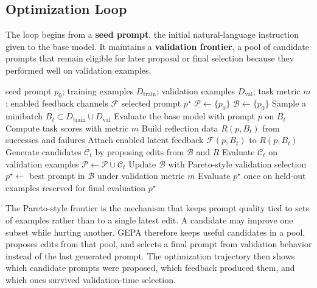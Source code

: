\documentclass[12pt,a4paper,twoside,openright]{book}
\begin{document}
\subsection{Optimization Loop}

The loop begins from a \textbf{seed prompt}, the initial natural-language
instruction given to the base model. It maintains a \textbf{validation frontier},
a pool of candidate prompts that remain eligible for later proposal or final
selection because they performed well on validation examples.

\begin{algorithm}[!htb]
    \caption{Latent-GEPA prompt optimization loop.}
    \label{alg:latent-gepa-loop}
    \begin{algorithmic}[1]
        \Require seed prompt $p_0$; training examples $D_{\mathrm{train}}$;
        validation examples $D_{\mathrm{val}}$; task metric $m$; enabled feedback
        channels $\mathcal{F}$
        \Ensure selected prompt $p^\star$
        \State $\mathcal{P} \gets \{p_0\}$ 
        \State $\mathcal{B} \gets \{p_0\}$ 
            \State Sample a minibatch $B_t \subset D_{\mathrm{train}} \cup D_{\mathrm{val}}$
                \State Evaluate the base model with prompt $p$ on $B_t$
                \State Compute task scores with metric $m$
                \State Build reflection data $R(p,B_t)$ from successes and failures
                \State Attach enabled latent feedback $\mathcal{F}(p,B_t)$ to $R(p,B_t)$
            \EndFor
            \State Generate candidates $\mathcal{C}_t$ by proposing edits from $\mathcal{B}$ and $R$
            \State Evaluate $\mathcal{C}_t$ on validation examples
            \State $\mathcal{P} \gets \mathcal{P} \cup \mathcal{C}_t$
            \State Update $\mathcal{B}$ with Pareto-style validation selection
        \EndFor
        \State $p^\star \gets$ best prompt in $\mathcal{B}$ under validation metric $m$
        \State Evaluate $p^\star$ once on held-out examples reserved for final evaluation
        \State \Return $p^\star$
    \end{algorithmic}
\end{algorithm}

The Pareto-style frontier is the mechanism that keeps prompt quality tied to
sets of examples rather than to a single latest edit. A candidate may improve
one subset while hurting another. GEPA therefore keeps useful candidates in a
pool, proposes edits from that pool, and selects a final prompt from validation
behavior instead of the last generated prompt. The optimization trajectory then
shows which candidate prompts were proposed, which feedback produced them, and
which ones survived validation-time selection.
\end{document}
